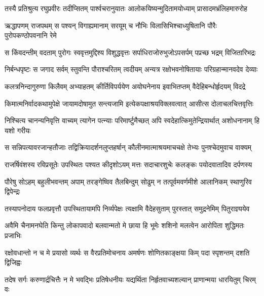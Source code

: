 \fourlineindentedshloka
{तस्यै प्रतिश्रुत्य रघुप्रवीरः}
{तदीप्सितम् पार्श्वचरानुयातः}
{आलोकयिष्यन्मुदितामयोध्याम्}
{प्रासादमभ्रंलिहमारुरोह} %

\fourlineindentedshloka
{ऋद्धापणम् राजपथम् स पश्यन्}
{विगाह्यमानाम् सरयूम् च नौभिः}
{विलासिभिश्चाध्युषितानि पौरैः}
{पुरोपकण्ठोपवनानि रेमे} %

\fourlineindentedshloka
{स किंवदन्तीम् वदताम् पुरोगः}
{स्ववृत्तमुद्दिश्य विशुद्धवृत्तः}
{सर्पाधिराजोरुभुजोऽपसर्पम्}
{पप्रच्छ भद्रम् विजितारिभद्रः} %

\fourlineindentedshloka
{निर्बन्धपृष्टः स जगाद सर्वम्}
{स्तुवन्ति पौराश्चरितम् त्वदीयम्}
{अन्यत्र रक्षोभवनोषितायाः}
{परिग्रहान्मानवदेव देव्याः} %

\fourlineindentedshloka
{कलत्रनिन्दागुरुणा किलैवम्}
{अभ्याहतम् कीर्तिविपर्ययेण}
{अयोघनेनाय इवाभितप्तम्}
{वैदेहिबन्धोर्हृदयम् विदद्रे} %

\fourlineindentedshloka
{किमात्मनिर्वादकथामुपेक्षे}
{जायामदोषामुत सन्त्यजामि}
{इत्येकपक्षाश्रयविक्लवत्वात्}
{आसीत्स दोलाचलचित्तवृत्तिः} %

\fourlineindentedshloka
{निश्चित्य चानन्यनिवृत्ति वाच्यम्}
{त्यागेन पत्न्याः परिमार्ष्टुमैच्छत्}
{अपि स्वदेहात्किमुतेन्द्रियार्थात्}
{अशोधनानाम् हि यशो गरीयः} %

\fourlineindentedshloka
{स सन्निपत्यावरजान्हतौजाः}
{तद्विक्रियादर्शनलुप्तहर्षान्}
{कौलीनमात्माश्रयमाचचक्षे}
{तेभ्यः पुनश्चेदमुवाच वाक्यम्} %

\fourlineindentedshloka
{राजर्षिवंशस्य रविप्रसूतेः}
{उपस्थितः पश्यत कीदृशोऽयम्}
{मत्तः सदाचारशुचेः कलङ्कः}
{पयोदवातादिव दर्पणस्य} %

\fourlineindentedshloka
{पौरेषु सोऽहम् बहुलीभवन्तम्}
{अपाम् तरङ्गेष्विव तैलबिन्दुम्}
{सोढुम् न तत्पूर्वमवर्णमीशे}
{आलानिकम् स्थाणुरिव द्विपेन्द्रः} %

\fourlineindentedshloka
{तस्यापनोदाय फलप्रवृत्तौ}
{उपस्थितायामपि निर्व्यपेक्षः}
{त्यक्षामि वैदेहसुताम् पुरस्तात्}
{समुद्रनेमिम् पितुराज्ञ्ययेव} %

\fourlineindentedshloka
{अवैमि चैनामनघेति किन्तु}
{लोकापवादो बलवान्मतो मे}
{छाया हि भूमेः शशिनो मलत्वेन}
{आरोपिता शुद्धिमतः प्रजाभिः} %

\fourlineindentedshloka
{रक्षोवधान्तो न च मे प्रयासो}
{व्यर्थः स वैरप्रतिमोचनाय}
{अमर्षणः शोणितकाङ्क्षया किम्}
{पदा स्पृशन्तम् दशति द्विजिह्वः} %

\fourlineindentedshloka
{तदेष सर्गः करुणार्द्रचित्तैः}
{न मे भवद्भिः प्रतिषेधनीयः}
{यद्यर्थिता निर्हृतवाच्यशल्यान्}
{प्राणान्मया धारयितुम् चिरम् वः} %

